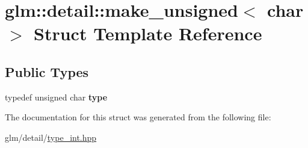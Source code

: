 \hypertarget{structglm_1_1detail_1_1make__unsigned_3_01char_01_4}{\section{glm\-:\-:detail\-:\-:make\-\_\-unsigned$<$ char $>$ Struct Template Reference}
\label{structglm_1_1detail_1_1make__unsigned_3_01char_01_4}
}
\subsection*{Public Types}
\begin{DoxyCompactItemize}
\item 
\hypertarget{structglm_1_1detail_1_1make__unsigned_3_01char_01_4_a473f89289be25f14bdc7c459e4be4fed}{typedef unsigned char {\bfseries type}}\label{structglm_1_1detail_1_1make__unsigned_3_01char_01_4_a473f89289be25f14bdc7c459e4be4fed}

\end{DoxyCompactItemize}


The documentation for this struct was generated from the following file\-:\begin{DoxyCompactItemize}
\item 
glm/detail/\hyperlink{type__int_8hpp}{type\-\_\-int.\-hpp}\end{DoxyCompactItemize}
